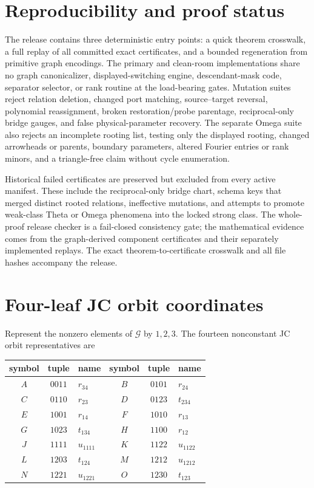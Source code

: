 \documentclass[11pt]{article}
\theoremstyle{remark}
\newcommand{\State}{\mathcal G}
\begin{document}
\section{Reproducibility and proof status}\label{sec:reproducibility}

The release contains three deterministic entry points: a quick theorem
crosswalk, a full replay of all committed exact certificates, and a bounded
regeneration from primitive graph encodings.  The primary and clean-room
implementations share no graph canonicalizer, displayed-switching engine,
descendant-mask code, separator selector, or rank routine at the
load-bearing gates.  Mutation suites reject relation deletion, changed port
matching, source--target reversal, polynomial reassignment, broken
restoration/probe parentage, reciprocal-only bridge gauges, and false
physical-parameter recovery.  The separate Omega suite also rejects an
incomplete rooting list, testing only the displayed rooting, changed
arrowheads or parents, boundary parameters, altered Fourier entries or rank
minors, and a triangle-free claim without cycle enumeration.

Historical failed certificates are preserved but excluded from every active
manifest.  These include the reciprocal-only bridge chart, schema keys that
merged distinct rooted relations, ineffective mutations, and attempts to
promote weak-class Theta or Omega phenomena into the locked strong class.
The whole-proof release checker is a fail-closed consistency gate; the
mathematical evidence comes from the graph-derived component certificates and
their separately implemented replays.  The exact theorem-to-certificate
crosswalk and all file hashes accompany the release.

\appendix

\section{Four-leaf JC orbit coordinates}\label{app:orbits}

Represent the nonzero elements of $\State$ by $1,2,3$.  The fourteen nonconstant
JC orbit representatives are
\begin{center}
\begin{tabular}{ccl@{\qquad}ccl}
\toprule
symbol & tuple & name & symbol & tuple & name\\
\midrule
$A$&$0011$&$r_{34}$ & $B$&$0101$&$r_{24}$\\
$C$&$0110$&$r_{23}$ & $D$&$0123$&$t_{234}$\\
$E$&$1001$&$r_{14}$ & $F$&$1010$&$r_{13}$\\
$G$&$1023$&$t_{134}$ & $H$&$1100$&$r_{12}$\\
$J$&$1111$&$u_{1111}$ & $K$&$1122$&$u_{1122}$\\
$L$&$1203$&$t_{124}$ & $M$&$1212$&$u_{1212}$\\
$N$&$1221$&$u_{1221}$ & $O$&$1230$&$t_{123}$\\
\bottomrule
\end{tabular}
\end{center}
\end{document}
